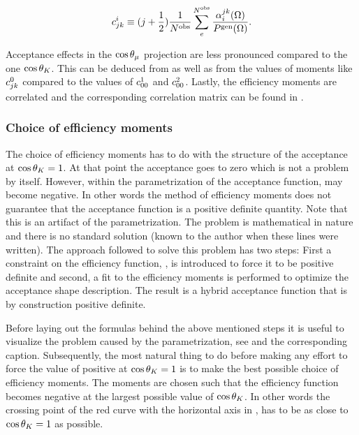 \begin{equation}
\centering
 c^i_{jk} \equiv (j + \frac{1}{2})  \frac{1}{\Nobs} \sum_e^{\Nobs} \frac{\effbase}{\Pgen}.
  \label{eff_moms_calc_final}
\end{equation}

\noindent Acceptance effects in the $\cos\theta_{\mu}$ projection are less pronounced compared to the one $\cos\theta_{K}$.
This can be deduced from  as well as from the values of moments like $c^{0}_{jk}$
compared to the values of $c^{1}_{00}$ and $c^{2}_{00}$. Lastly, the efficiency moments are
correlated and the corresponding correlation matrix can be found in .

\subsubsection{Choice of efficiency moments}
The choice of efficiency moments has to do with the structure of the acceptance at $\cos\theta_{K}=1$. At that point the acceptance goes to zero
which is not a problem by itself. However, within the parametrization of the acceptance function,  may become negative.
In other words the method of efficiency moments does not guarantee that the acceptance function is a positive definite quantity.
Note that this is an artifact of the parametrization. The problem is mathematical in nature and there is no standard solution (known
to the author when these lines were written). The approach followed to solve this problem has two steps: First a constraint on the
efficiency function, , is introduced to force it to be positive definite and second, a fit to the efficiency
moments is performed to optimize the acceptance shape description. The result is a hybrid acceptance function that is by
construction positive definite.

Before laying out the formulas behind the above mentioned steps it is useful to visualize the problem caused by the parametrization, see 
and the corresponding caption. Subsequently, the most natural thing to do before making any effort to force the value of 
positive at $\cos\theta_{K}=1$ is to make the best possible choice of efficiency moments. The moments are chosen such that the efficiency function becomes negative
at the largest possible value of $\cos\theta_{K}$. In other words the crossing point of the red curve with the horizontal axis in ,
has to be as close to $\cos\theta_{K}=1$ as possible.

